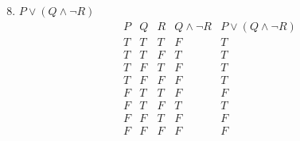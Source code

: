 \documentclass{article}
\begin{document}
\begin{enumerate}
    \setcounter{enumi}{7}
    \item $P \lor (Q \land \neg R)$
    \[
    \begin{array}{c|c|c|c|c}
        P & Q & R & Q \land \neg R & P \lor (Q \land \neg R) \\ \hline
        T & T & T &       F        &            T            \\ \hline
        T & T & F &       T        &            T            \\ \hline
        T & F & T &       F        &            T            \\ \hline
        T & F & F &       F        &            T            \\ \hline
        F & T & T &       F        &            F            \\ \hline
        F & T & F &       T        &            T            \\ \hline
        F & F & T &       F        &            F            \\ \hline
        F & F & F &       F        &            F            \\
    
    \end{array}
    \]
\end{enumerate}

\end{document}
